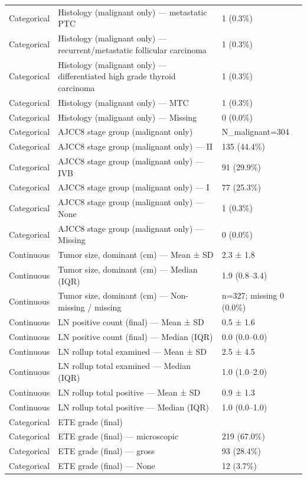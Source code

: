 \begin{table}[htbp]
\begin{tabular}{lll}
Categorical & Histology (malignant only) — metastatic PTC & 1 (0.3\%) \\
Categorical & Histology (malignant only) — recurrent/metastatic follicular carcinoma & 1 (0.3\%) \\
Categorical & Histology (malignant only) — differentiated high grade thyroid carcinoma & 1 (0.3\%) \\
Categorical & Histology (malignant only) — MTC & 1 (0.3\%) \\
Categorical & Histology (malignant only) — Missing & 0 (0.0\%) \\
Categorical & AJCC8 stage group (malignant only) & N\_malignant=304 \\
Categorical & AJCC8 stage group (malignant only) — II & 135 (44.4\%) \\
Categorical & AJCC8 stage group (malignant only) — IVB & 91 (29.9\%) \\
Categorical & AJCC8 stage group (malignant only) — I & 77 (25.3\%) \\
Categorical & AJCC8 stage group (malignant only) — None & 1 (0.3\%) \\
Categorical & AJCC8 stage group (malignant only) — Missing & 0 (0.0\%) \\
Continuous & Tumor size, dominant (cm) — Mean ± SD & 2.3 ± 1.8 \\
Continuous & Tumor size, dominant (cm) — Median (IQR) & 1.9 (0.8–3.4) \\
Continuous & Tumor size, dominant (cm) — Non-missing / missing & n=327; missing 0 (0.0\%) \\
Continuous & LN positive count (final) — Mean ± SD & 0.5 ± 1.6 \\
Continuous & LN positive count (final) — Median (IQR) & 0.0 (0.0–0.0) \\
Continuous & LN rollup total examined — Mean ± SD & 2.5 ± 4.5 \\
Continuous & LN rollup total examined — Median (IQR) & 1.0 (1.0–2.0) \\
Continuous & LN rollup total positive — Mean ± SD & 0.9 ± 1.3 \\
Continuous & LN rollup total positive — Median (IQR) & 1.0 (0.0–1.0) \\
Categorical & ETE grade (final) &  \\
Categorical & ETE grade (final) — microscopic & 219 (67.0\%) \\
Categorical & ETE grade (final) — gross & 93 (28.4\%) \\
Categorical & ETE grade (final) — None & 12 (3.7\%) \\

\end{tabular}
\end{table}
